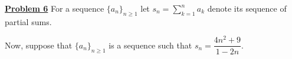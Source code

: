 \documentclass[12pt]{article}
\begin{document}
%
%
%
%
%
%
%
%
%
%
%
%
%
%
%
%
\textbf{\underline{Problem 6}} 
For a sequence $\{a_n\}_{n \geq 1}$ let $s_n = \sum^n_{k=1} a_k$ denote its sequence of partial sums.

Now, suppose that $\{a_n\}_{n \geq 1}$ is a sequence such that $s_n = \dfrac{4n^2+9}{1-2n}$.  
\end{document}
